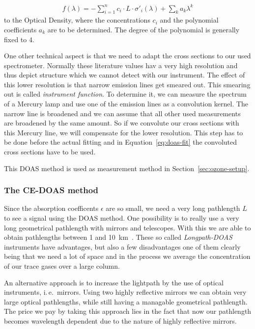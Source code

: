 \begin{align}
  f(\lambda) = - \sum_{i=1}^n c_i \cdot L \cdot \sigma'_i(\lambda) +
  \sum_k a_k \lambda^k \label{eq:doas-fit}
\end{align}
to the Optical Density, where the concentrations $c_i$ and the polynomial
coefficients $a_k$ are to be determined. The degree of the polynomial
is generally fixed to \num{4}.

One other technical aspect is that we need to adapt the cross sections
to our used spectrometer. Normally these literature values hav a very
high resolution and thus depict structure which we cannot detect with
our instrument. The effect of this lower resolution is that narrow
emission lines get smeared out. This smearing out is called
\emph{instrument function}. To determine it, we can measure the
spectrum of a Mercury lamp and use one of the emission lines as a
convolution kernel. The narrow line is broadened and we can assume
that all other used measurements are broadened by the same amount. So
if we convolute our cross sections with this Mercury line, we will
compensate for the lower resolution. This step has to be done before
the actual fitting and in Equation~\eqref{eq:doas-fit} the convoluted
cross sections have to be used.

This DOAS method is used as measurement method in
Section~\ref{sec:ozone-setup}. 

\subsubsection{The CE-DOAS method}
\label{sec:ce-doas}

Since the absorption coefficents $\epsilon$ are so small, we need a
very long pathlength $L$ to see a signal using the DOAS method. One
possibility is to really use a very long geometrical pathlength with
mirrors and telescopes. With this we are able to obtain pathlengths
between \num{1} and \SI{10}{\kilo\meter}~\cite{platt}. These so called
\emph{Longpath-DOAS} instruments have advantages, but also a few
disadvantages one of them clearly being that we need a lot of space
and in the process we average the concentration of our trace gases
over a large column.

An alternative approach is to increase the lightpath by the use of
optical instruments, i.\,e.\ mirrors. Using two highly reflective
mirrors we can obtain very large optical pathlengths, while still
having a managable geometrical pathlength. The price we pay by taking
this approach lies in the fact that now our pathlength becomes
wavelength dependent due to the nature of highly reflective mirrors. 

